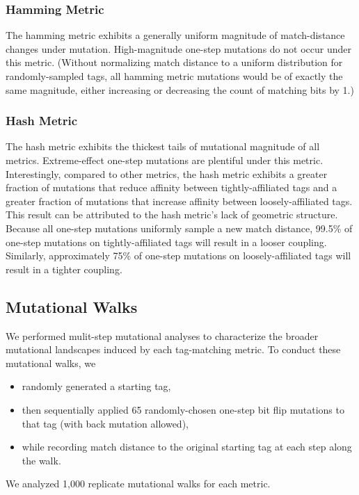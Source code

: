 \subsubsection{Hamming Metric}

The hamming metric exhibits a generally uniform magnitude of match-distance changes under mutation.
High-magnitude one-step mutations do not occur under this metric.
(Without normalizing match distance to a uniform distribution for randomly-sampled tags, all hamming metric mutations would be of exactly the same magnitude, either increasing or decreasing the count of matching bits by 1.)

\subsubsection{Hash Metric}

The hash metric exhibits the thickest tails of mutational magnitude of all metrics.
Extreme-effect one-step mutations are plentiful under this metric.
Interestingly, compared to other metrics, the hash metric exhibits a greater fraction of mutations that reduce affinity between tightly-affiliated tags and a greater fraction of mutations that increase affinity between loosely-affiliated tags.
This result can be attributed to the hash metric's lack of geometric structure.
Because all one-step mutations uniformly sample a new match distance, 99.5\% of one-step mutations on tightly-affiliated tags will result in a looser coupling.
Similarly, approximately 75\% of one-step mutations on loosely-affiliated tags will result in a tighter coupling.

\subsection{Mutational Walks} \label{sec:mutational_walks}



We performed mulit-step mutational analyses to characterize the broader mutational landscapes induced by each tag-matching metric.
To conduct these mutational walks, we
\begin{itemize}
    \item randomly generated a starting tag,
    \item then sequentially applied 65 randomly-chosen one-step bit flip mutations to that tag (with back mutation allowed),
    \item while recording match distance to the original starting tag at each step along the walk.
\end{itemize}
We analyzed 1,000 replicate mutational walks for each metric.

